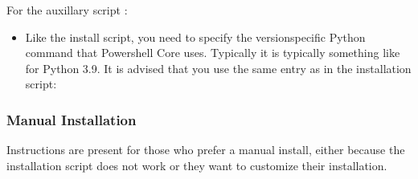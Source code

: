 \documentclass[letterpaper,11pt,english]{sphinxmanual}
\begin{document}
\sphinxAtStartPar
For the auxillary script :
\begin{itemize}
\item {} 
\sphinxAtStartPar
Like the install script, you need to specify the version\sphinxhyphen{}specific Python command that Powershell Core uses. Typically it is typically something like  for Python 3.9. It is advised that you use the same entry as in the installation script:

\begin{sphinxVerbatim}[commandchars=\\\{\}]
    
\end{sphinxVerbatim}

\end{itemize}


\subsubsection{Manual Installation}
\label{\detokenize{technical/installation/index:manual-installation}}\label{\detokenize{technical/installation/index:technical-installation-manual-installation}}
\sphinxAtStartPar
Instructions are present for those who prefer a manual install, either because
the installation script does not work or they want to customize their
installation.
\end{document}
